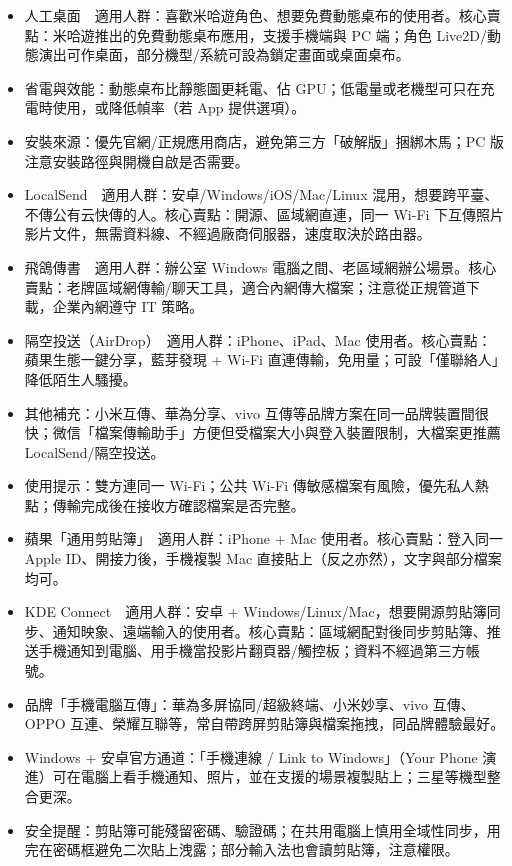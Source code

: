 
\begin{itemize}
  \item 人工桌面　適用人群：喜歡米哈遊角色、想要免費動態桌布的使用者。核心賣點：米哈遊推出的免費動態桌布應用，支援手機端與 PC 端；角色 Live2D/動態演出可作桌面，部分機型/系統可設為鎖定畫面或桌面桌布。
  \item 省電與效能：動態桌布比靜態圖更耗電、佔 GPU；低電量或老機型可只在充電時使用，或降低幀率（若 App 提供選項）。
  \item 安裝來源：優先官網/正規應用商店，避免第三方「破解版」捆綁木馬；PC 版注意安裝路徑與開機自啟是否需要。
\end{itemize}


\begin{itemize}
  \item LocalSend　適用人群：安卓/Windows/iOS/Mac/Linux 混用，想要跨平臺、不傳公有云快傳的人。核心賣點：開源、區域網直連，同一 Wi-Fi 下互傳照片影片文件，無需資料線、不經過廠商伺服器，速度取決於路由器。
  \item 飛鴿傳書　適用人群：辦公室 Windows 電腦之間、老區域網辦公場景。核心賣點：老牌區域網傳輸/聊天工具，適合內網傳大檔案；注意從正規管道下載，企業內網遵守 IT 策略。
  \item 隔空投送（AirDrop）　適用人群：iPhone、iPad、Mac 使用者。核心賣點：蘋果生態一鍵分享，藍芽發現 + Wi-Fi 直連傳輸，免用量；可設「僅聯絡人」降低陌生人騷擾。
  \item 其他補充：小米互傳、華為分享、vivo 互傳等品牌方案在同一品牌裝置間很快；微信「檔案傳輸助手」方便但受檔案大小與登入裝置限制，大檔案更推薦 LocalSend/隔空投送。
  \item 使用提示：雙方連同一 Wi-Fi；公共 Wi-Fi 傳敏感檔案有風險，優先私人熱點；傳輸完成後在接收方確認檔案是否完整。
\end{itemize}


\begin{itemize}
  \item 蘋果「通用剪貼簿」　適用人群：iPhone + Mac 使用者。核心賣點：登入同一 Apple ID、開接力後，手機複製 Mac 直接貼上（反之亦然），文字與部分檔案均可。
  \item KDE Connect　適用人群：安卓 + Windows/Linux/Mac，想要開源剪貼簿同步、通知映象、遠端輸入的使用者。核心賣點：區域網配對後同步剪貼簿、推送手機通知到電腦、用手機當投影片翻頁器/觸控板；資料不經過第三方帳號。
  \item 品牌「手機電腦互傳」：華為多屏協同/超級終端、小米妙享、vivo 互傳、OPPO 互連、榮耀互聯等，常自帶跨屏剪貼簿與檔案拖拽，同品牌體驗最好。
  \item Windows + 安卓官方通道：「手機連線 / Link to Windows」（Your Phone 演進）可在電腦上看手機通知、照片，並在支援的場景複製貼上；三星等機型整合更深。
  \item 安全提醒：剪貼簿可能殘留密碼、驗證碼；在共用電腦上慎用全域性同步，用完在密碼框避免二次貼上洩露；部分輸入法也會讀剪貼簿，注意權限。
\end{itemize}

